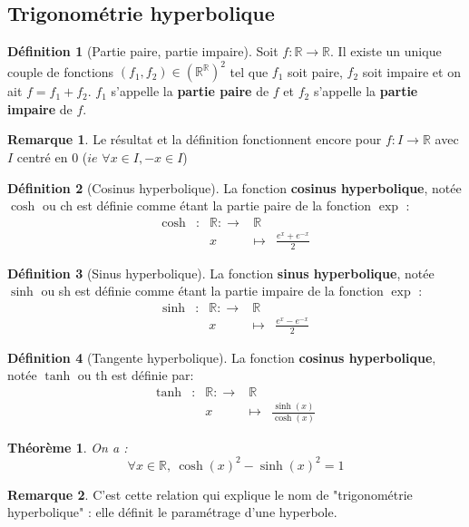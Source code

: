 \documentclass[french]{book}
\newcommand{\R}{\mathbb{R}}
\theoremstyle{plain}
\newtheorem{thm}{Théorème}[chapter]
\theoremstyle{definition}
\newtheorem{dfn}{Définition}[chapter]
\newtheorem{rmq}{Remarque}[chapter]
\theoremstyle{remark}
\begin{document}
\subsection{Trigonométrie hyperbolique}
\begin{dfn}[Partie paire, partie impaire]
	Soit $f:\R\rightarrow\R$. Il existe un unique couple de fonctions $(f_1,f_2)\in\left(\R^\R\right)^2$ tel que $f_1$ soit paire, $f_2$ soit impaire et on ait $f=f_1+f_2$. $f_1$ s'appelle la \textbf{partie paire} de $f$ et $f_2$ s'appelle la \textbf{partie impaire} de $f$.
\end{dfn}
\begin{rmq}
	Le résultat et la définition fonctionnent encore pour $f:I\rightarrow\R$ avec $I$ centré en $0$ ($ie$ $\forall x\in I, -x\in I$)
\end{rmq}
\begin{dfn}[Cosinus hyperbolique]
	La fonction \textbf{cosinus hyperbolique}, notée $\cosh$ ou ch est définie comme étant la partie paire de la fonction $\exp$ : $$\begin{array}{ccccc}\cosh&:&\R:\rightarrow&\R\\&&x&\mapsto&\displaystyle\frac{e^x+e^{-x}}{2}\end{array}$$
\end{dfn}
\begin{dfn}[Sinus hyperbolique]
	La fonction \textbf{sinus hyperbolique}, notée $\sinh$ ou sh est définie comme étant la partie impaire de la fonction $\exp$ : $$\begin{array}{ccccc}\sinh&:&\R:\rightarrow&\R\\&&x&\mapsto&\displaystyle\frac{e^x-e^{-x}}{2}\end{array}$$
\end{dfn}
\begin{dfn}[Tangente hyperbolique]
	La fonction \textbf{cosinus hyperbolique}, notée $\tanh$ ou th est définie par: $$\begin{array}{ccccc}\tanh&:&\R:\rightarrow&\R\\&&x&\mapsto&\displaystyle\frac{\sinh(x)}{\cosh(x)}\end{array}$$
\end{dfn}
\begin{thm}
	On a : $$\forall x\in\R,\ \cosh(x)^2-\sinh(x)^2=1$$
\end{thm}
\begin{rmq}
	C'est cette relation qui explique le nom de "trigonométrie hyperbolique" : elle définit le paramétrage d'une hyperbole.
\end{rmq}
\end{document}
